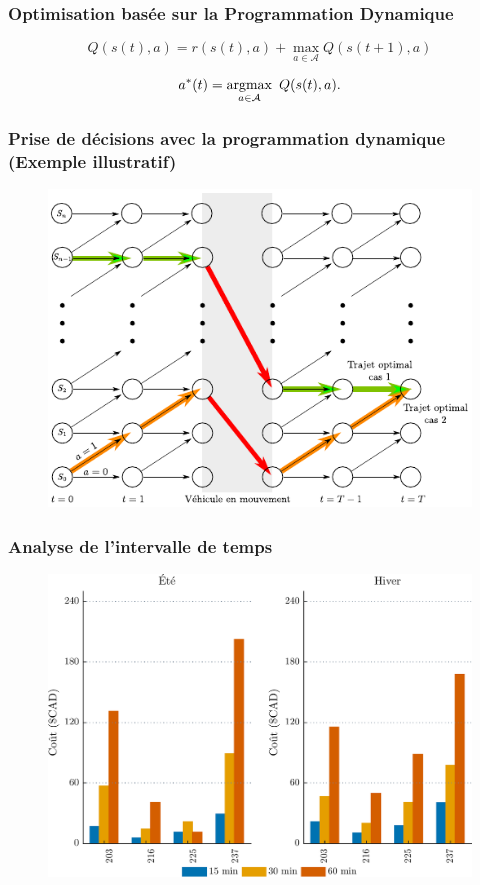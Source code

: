 \documentclass[french]{beamer}
\begin{document}
{\begin{frame}
\begin{center}
\frametitle{Optimisation basée sur la Programmation Dynamique}

\begin{equation}
Q(s(t),a) =
r(s(t),a) + \max\limits_{a\in\mathcal{A}} Q(s(t+1),a) 
\end{equation}

\begin{equation}
a^*(t) = \argmax\limits_{a\in\mathcal{A}}~Q(s(t),a).\label{eq:adecisions}
\end{equation}
\end{center}
\end{frame}


\begin{frame}
\frametitle{Prise de décisions avec la programmation dynamique (Exemple illustratif)}
\begin{center}
\begin{figure}
\includegraphics[width=0.7\linewidth]{figDinamycProgram02.pdf}
\end{figure} 
 \end{center}
\end{frame}


\begin{frame}
\frametitle{Analyse de l'intervalle de temps}
\begin{center}
\begin{figure}
\includegraphics[width=0.9\linewidth]{figresDeltaWithoutGasBWcolor02-Sout2.pdf}
\end{figure} 
 \end{center}
\end{frame}

}
\end{document}
